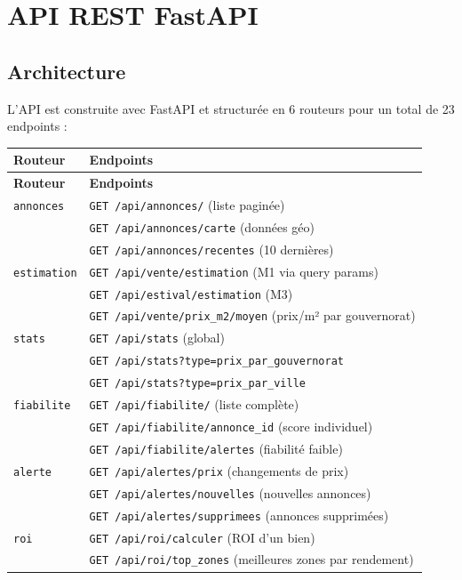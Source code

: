 \documentclass[12pt,a4paper]{report}
\begin{document}
\chapter{API REST FastAPI}

\section{Architecture}

L'API est construite avec FastAPI et structurée en 6 routeurs pour un total de 23 endpoints :

\begin{longtable}{ll}
\toprule
\textbf{Routeur} & \textbf{Endpoints} \\
\midrule
\endfirsthead
\toprule
\textbf{Routeur} & \textbf{Endpoints} \\
\midrule
\endhead
\bottomrule
\endfoot
\texttt{annonces} & \texttt{GET /api/annonces/} (liste paginée) \\
 & \texttt{GET /api/annonces/carte} (données géo) \\
 & \texttt{GET /api/annonces/recentes} (10 dernières) \\
\texttt{estimation} & \texttt{GET /api/vente/estimation} (M1 via query params) \\
 & \texttt{GET /api/estival/estimation} (M3) \\
 & \texttt{GET /api/vente/prix\_m2/moyen} (prix/m² par gouvernorat) \\
\texttt{stats} & \texttt{GET /api/stats} (global) \\
 & \texttt{GET /api/stats?type=prix\_par\_gouvernorat} \\
 & \texttt{GET /api/stats?type=prix\_par\_ville} \\
\texttt{fiabilite} & \texttt{GET /api/fiabilite/} (liste complète) \\
 & \texttt{GET /api/fiabilite/{annonce\_id}} (score individuel) \\
 & \texttt{GET /api/fiabilite/alertes} (fiabilité faible) \\
\texttt{alerte} & \texttt{GET /api/alertes/prix} (changements de prix) \\
 & \texttt{GET /api/alertes/nouvelles} (nouvelles annonces) \\
 & \texttt{GET /api/alertes/supprimees} (annonces supprimées) \\
\texttt{roi} & \texttt{GET /api/roi/calculer} (ROI d'un bien) \\
 & \texttt{GET /api/roi/top\_zones} (meilleures zones par rendement) \\
\bottomrule
\end{longtable}
\end{document}
